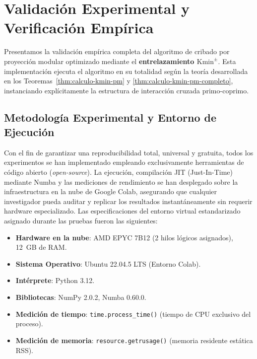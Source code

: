 \documentclass{article}
\numberwithin{equation}{section}
\theoremstyle{plain}
\theoremstyle{definition}
\begin{document}

\section{Validación Experimental y Verificación Empírica}
\label{sec:validacion-experimental}

Presentamos la validación empírica completa del algoritmo de cribado por proyección modular optimizado mediante el \textbf{entrelazamiento $\mathrm{Kmin}^\pm$}. Esta implementación ejecuta el algoritmo en su totalidad según la teoría desarrollada en los Teoremas~\ref{thm:calculo-kmin-pm} y \ref{thm:calculo-kmin-pm-completo}, instanciando explícitamente la estructura de interacción cruzada primo-coprimo.

\subsection{Metodología Experimental y Entorno de Ejecución}

Con el fin de garantizar una reproducibilidad total, universal y gratuita, todos los experimentos se han implementado empleando exclusivamente herramientas de código abierto (\textit{open-source}). La ejecución, compilación JIT (Just-In-Time) mediante Numba y las mediciones de rendimiento se han desplegado sobre la infraestructura en la nube de Google Colab, asegurando que cualquier investigador pueda auditar y replicar los resultados instantáneamente sin requerir hardware especializado. Las especificaciones del entorno virtual estandarizado asignado durante las pruebas fueron las siguientes:

\begin{itemize}
    \item \textbf{Hardware en la nube}: AMD EPYC 7B12 (2 hilos lógicos asignados), 12~GB de RAM.
    \item \textbf{Sistema Operativo}: Ubuntu 22.04.5 LTS (Entorno Colab).
    \item \textbf{Intérprete}: Python 3.12.
    \item \textbf{Bibliotecas}: NumPy 2.0.2, Numba 0.60.0.
    \item \textbf{Medición de tiempo}: \texttt{time.process\_time()} (tiempo de CPU exclusivo del proceso).
    \item \textbf{Medición de memoria}: \texttt{resource.getrusage()} (memoria residente estática RSS).
\end{itemize}
\end{document}
